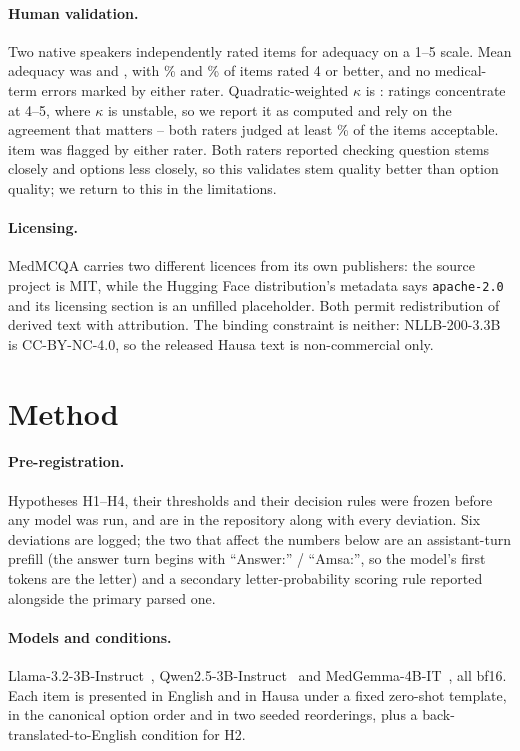 \documentclass[11pt,a4paper]{article}
\begin{document}
\paragraph{Human validation.}
Two native speakers independently rated \ValN{} items for adequacy on a 1--5
scale. Mean adequacy was \ValAdequacyOne{} and \ValAdequacyTwo{}, with
\ValGeFourOnePct{}\% and \ValGeFourTwoPct{}\% of items rated 4 or better, and no
medical-term errors marked by either rater. Quadratic-weighted $\kappa$ is
\ValKappa{}: ratings concentrate at 4--5, where $\kappa$ is unstable, so we
report it as computed and rely on the agreement that matters -- both raters
judged at least \ValMinGeFourPct{}\% of the items acceptable. \ValFlagged{} item
was flagged by either rater.
Both raters reported checking question stems closely and options less closely,
so this validates stem quality better than option quality; we return to this in
the limitations.

\paragraph{Licensing.}
MedMCQA carries two different licences from its own publishers: the source
project is MIT, while the Hugging Face distribution's metadata says
\texttt{apache-2.0} and its licensing section is an unfilled placeholder. Both
permit redistribution of derived text with attribution. The binding constraint
is neither: NLLB-200-3.3B is CC-BY-NC-4.0, so the released Hausa text is
non-commercial only.

\section{Method}

\paragraph{Pre-registration.}
Hypotheses H1--H4, their thresholds and their decision rules were frozen before
any model was run, and are in the repository along with every deviation. Six
deviations are logged; the two that affect the numbers below are an
assistant-turn prefill (the answer turn begins with ``Answer:'' / ``Amsa:'', so
the model's first tokens are the letter) and a secondary letter-probability
scoring rule reported alongside the primary parsed one.

\paragraph{Models and conditions.}
Llama-3.2-3B-Instruct~\cite{llama32}, Qwen2.5-3B-Instruct~\cite{qwen25} and
MedGemma-4B-IT~\cite{medgemma}, all bf16. Each item is presented in English and in Hausa
under a fixed zero-shot template, in the canonical option order and in two seeded reorderings,
plus a back-translated-to-English condition for H2.
\end{document}
